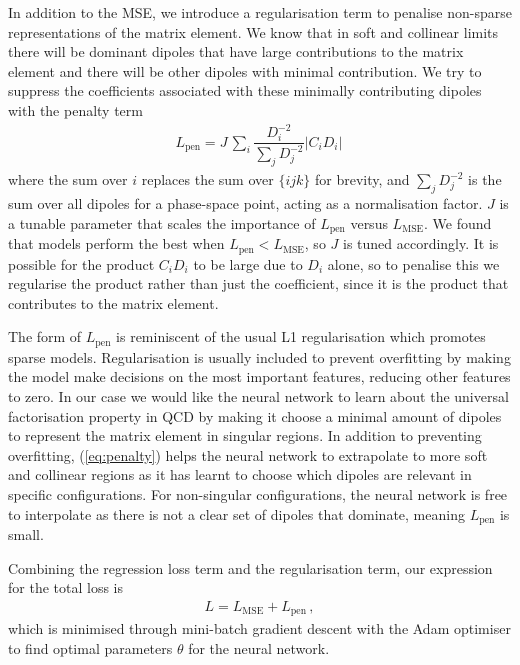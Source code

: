 \documentclass[main.tex]{subfiles}
\begin{document}
In addition to the MSE, we introduce a regularisation term to penalise non-sparse representations of the matrix element. We know that in soft and collinear limits there will be dominant dipoles that have large contributions to the matrix element and there will be other dipoles with minimal contribution. We try to suppress the coefficients associated with these minimally contributing dipoles with the penalty term
\begin{eqnarray}\label{eq:penalty}
    L_{\mathrm{pen}} = J \, \sum_{i} \dfrac{D_{i}^{-2}}{\sum_{j}D_{j}^{-2}} |C_{i}D_{i}| \,
\end{eqnarray}
where the sum over $i$ replaces the sum over $\{ijk\}$ for brevity, and $\sum_{j} D_{j}^{-2}$ is the sum over all dipoles for a phase-space point, acting as a normalisation factor.
$J$ is a tunable parameter that scales the importance of $L_{\mathrm{pen}}$ versus $L_{\mathrm{MSE}}$.
We found that models perform the best when $L_{\mathrm{pen}} < L_{\mathrm{MSE}}$, so $J$ is tuned accordingly.
It is possible for the product $C_{i}D_{i}$ to be large due to $D_{i}$ alone, so to penalise this we regularise the product rather than just the coefficient, since it is the product that contributes to the matrix element.

The form of $L_{\mathrm{pen}}$ is reminiscent of the usual L1 regularisation which promotes sparse models.
Regularisation is usually included to prevent overfitting by making the model make decisions on the most important features, reducing other features to zero.
In our case we would like the neural network to learn about the universal factorisation property in QCD by making it choose a minimal amount of dipoles to represent the matrix element in singular regions.
In addition to preventing overfitting, (\ref{eq:penalty}) helps the neural network to extrapolate to more soft and collinear regions as it has learnt to choose which dipoles are relevant in specific configurations.
For non-singular configurations, the neural network is free to interpolate as there is not a clear set of dipoles that dominate, meaning $L_{\mathrm{pen}}$ is small.

Combining the regression loss term and the regularisation term, our expression for the total loss is
\begin{eqnarray}\label{eq:loss}
    L = L_{\mathrm{MSE}} + L_{\mathrm{pen}} \, ,
\end{eqnarray}
which is minimised through mini-batch gradient descent \cite{bottou2018optimization} with the Adam optimiser \cite{Kingma:2014vow} to find optimal parameters $\theta$ for the neural network.
\end{document}
